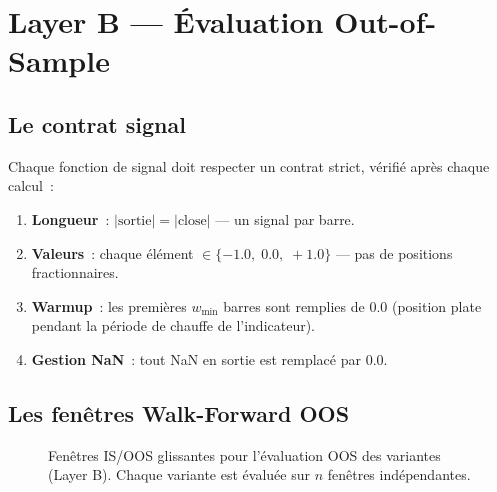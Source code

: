\section{Layer B --- Évaluation Out-of-Sample}
\label{sec:layer_b}

\subsection{Le contrat signal}

Chaque fonction de signal doit respecter un contrat strict, vérifié après chaque
calcul~:

\begin{enumerate}
    \item \textbf{Longueur}~: $|\text{sortie}| = |\text{close}|$ — un signal par barre.
    \item \textbf{Valeurs}~: chaque élément $\in \{-1.0,\; 0.0,\; +1.0\}$ — pas de
    positions fractionnaires.
    \item \textbf{Warmup}~: les premières $w_{\min}$ barres sont remplies de $0.0$
    (position plate pendant la période de chauffe de l'indicateur).
    \item \textbf{Gestion NaN}~: tout NaN en sortie est remplacé par $0.0$.
\end{enumerate}

\subsection{Les fenêtres Walk-Forward OOS}

\begin{figure}[H]
\centering
{}
\caption{Fenêtres IS/OOS glissantes pour l'évaluation OOS des variantes (Layer B).
Chaque variante est évaluée sur $n$ fenêtres indépendantes.}
\label{fig:oos_windows}
\end{figure}

